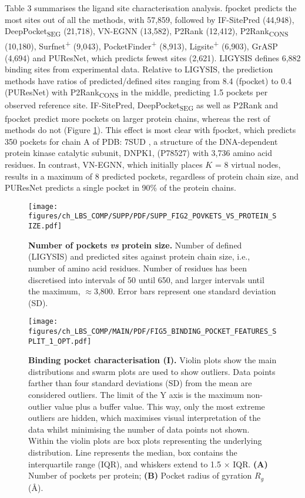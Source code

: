 Table 3 summarises the ligand site characterisation analysis. fpocket predicts the most sites out of all the methods, with 57,859, followed by IF-SitePred (44,948), DeepPocket\textsubscript{SEG} (21,718), VN-EGNN (13,582), P2Rank (12,412), P2Rank\textsubscript{CONS} (10,180), Surfnet\textsuperscript{+} (9,043), PocketFinder\textsuperscript{+} (8,913), Ligsite\textsuperscript{+} (6,903), GrASP (4,694) and PUResNet, which predicts fewest sites (2,621). LIGYSIS defines 6,882 binding sites from experimental data. Relative to LIGYSIS, the prediction methods have ratios of predicted/defined sites ranging from 8.4 (fpocket) to 0.4 (PUResNet) with P2Rank\textsubscript{CONS} in the middle, predicting 1.5 pockets per observed reference site. IF-SitePred, DeepPocket\textsubscript{SEG} as well as P2Rank and fpocket predict more pockets on larger protein chains, whereas the rest of methods do not (Figure \ref{fig:sites_vs_prot_size}). This effect is most clear with fpocket, which predicts 350 pockets for chain A of PDB: 7SUD \cite{LIU_2022_DNAPK}, a structure of the DNA-dependent protein kinase catalytic subunit, DNPK1, (P78527) with 3,736 amino acid residues. In contrast, VN-EGNN, which initially places $K$ = 8 virtual nodes, results in a maximum of 8 predicted pockets, regardless of protein chain size, and PUResNet predicts a single pocket in 90\% of the protein chains. 

\begin{figure}[ht!]
    \centering
    \texttt{[image: figures/ch\_LBS\_COMP/SUPP/PDF/SUPP\_FIG2\_POVKETS\_VS\_PROTEIN\_SIZE.pdf]}
    \caption[Number of pockets \textit{vs} protein size]{\textbf{Number of pockets \textit{vs} protein size.} Number of defined (LIGYSIS) and predicted sites against protein chain size, i.e., number of amino acid residues. Number of residues has been discretised into intervals of 50 until 650, and larger intervals until the maximum, $\approx$3,800. Error bars represent one standard deviation (SD).}
    \label{fig:sites_vs_prot_size}
\end{figure}

\begin{figure}[ht!]
    \centering
    \texttt{[image: figures/ch\_LBS\_COMP/MAIN/PDF/FIG5\_BINDING\_POCKET\_FEATURES\_SPLIT\_1\_OPT.pdf]}
    \caption[Binding pocket characterisation (I)]{\textbf{Binding pocket characterisation (I).} Violin plots show the main distributions and swarm plots are used to show outliers. Data points farther than four standard deviations (SD) from the mean are considered outliers. The limit of the Y axis is the maximum non-outlier value plus a buffer value. This way, only the most extreme outliers are hidden, which maximises visual interpretation of the data whilst minimising the number of data points not shown. Within the violin plots are box plots representing the underlying distribution. Line represents the median, box contains the interquartile range (IQR), and whiskers extend to 1.5 $\times$ IQR. \textbf{(A)} Number of pockets per protein; \textbf{(B)} Pocket radius of gyration $R_{g}$ (\AA{}).}
    \label{fig:pocket_features_1}
\end{figure}

